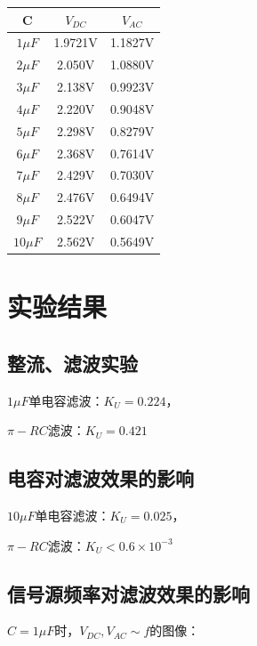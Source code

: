 \documentclass[a4paper]{ltxdoc}
\begin{document}
\begin{multicols}{2}
    \begin{tabular}{|c|c|c|}
        \hline \textbf{C} & \textbf{$V_{DC}$} & \textbf{$V_{AC}$} \\
        \hline $1\mu F$   & 1.9721V           & 1.1827V           \\
        \hline $2\mu F$   & 2.050V            & 1.0880V           \\
        \hline $3\mu F$   & 2.138V            & 0.9923V           \\
        \hline $4\mu F$   & 2.220V            & 0.9048V           \\
        \hline $5\mu F$   & 2.298V            & 0.8279V           \\
        \hline $6\mu F$   & 2.368V            & 0.7614V           \\
        \hline $7\mu F$   & 2.429V            & 0.7030V           \\
        \hline $8\mu F$   & 2.476V            & 0.6494V           \\
        \hline $9\mu F$   & 2.522V            & 0.6047V           \\
        \hline $10\mu F$  & 2.562V            & 0.5649V           \\\hline
    \end{tabular}

    \section{实验结果}
    \subsection{整流、滤波实验}
    $1\mu F$单电容滤波：$K_U = 0.224$，

    $\pi- RC$滤波：$K_U = 0.421$

    \subsection{电容对滤波效果的影响}
    $10\mu F$单电容滤波：$K_U = 0.025$，

    $\pi- RC$滤波：$K_U<0.6\times 10^{-3}$

    \subsection{信号源频率对滤波效果的影响}
    \noindent
    $C = 1\mu F$时，$V_{DC},V_{AC} \sim f$的图像：


\end{multicols}
\end{document}
